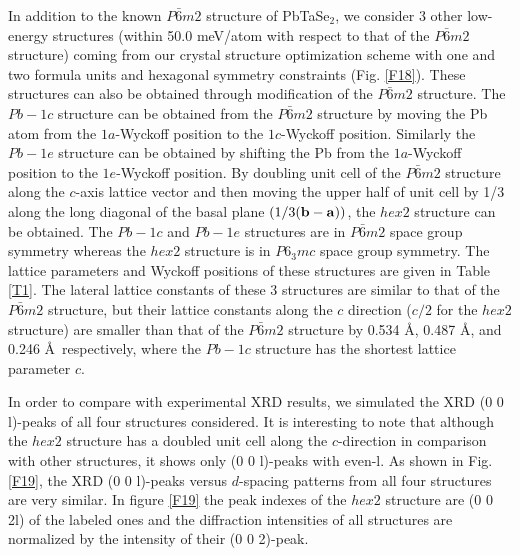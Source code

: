 \documentclass[aps,prb,preprint,groupedaddress,showpacs,amsmath,amssymb]{revtex4}
\begin{document}
In addition to the known $P\bar{6}m2$ structure of PbTaSe$_2$, we consider 3 other low-energy structures (within 50.0 meV/atom with respect to that of the $P\bar{6}m2$ structure) coming from our crystal structure optimization scheme with one and two formula units and hexagonal symmetry constraints (Fig. \ref{F18}). These structures can also be obtained through modification of the $P\bar{6}m2$ structure. The $Pb{-}1c$ structure can be obtained from the $P\bar{6}m2$ structure by moving the Pb atom from the $1a$-Wyckoff position to the $1c$-Wyckoff position. Similarly the $Pb{-}1e$ structure can be obtained by shifting the Pb from the $1a$-Wyckoff position  to the $1e$-Wyckoff position. By doubling unit cell of the $P\bar{6}m2$ structure along the $c$-axis lattice vector and then moving the upper half of unit cell by 1/3 along the long diagonal of the basal plane $(1/3(\bold{b} - \bold{a}))$, the $hex2$ structure can be obtained. The $Pb{-}1c$ and $Pb{-}1e$ structures are in $P\bar{6}m2$ space group symmetry whereas the $hex2$ structure is in $P6_3mc$ space group symmetry. The lattice parameters and Wyckoff positions of these structures are given in Table \ref{T1}. The lateral lattice constants of these 3 structures are similar to that of the $P\bar{6}m2$ structure, but their lattice constants along the $c$ direction ($c/2$ for the $hex2$ structure) are smaller than that of the $P\bar{6}m2$ structure by 0.534 \AA, 0.487 \AA, and 0.246 \AA~respectively, where the $Pb{-}1c$ structure has the shortest lattice parameter $c$. 

In order to compare with experimental XRD  results, we simulated the XRD (0 0 l)-peaks of all four structures considered. It is interesting to note that although the $hex2$ structure has a doubled unit cell along the $c$-direction in comparison with other structures, it shows only (0 0 l)-peaks with even-l. As shown in Fig. \ref{F19}, the XRD (0 0 l)-peaks versus $d$-spacing patterns from all four structures are very similar. In figure \ref{F19} the peak indexes of the $hex2$ structure are (0 0 2l) of the labeled ones and the diffraction intensities of all structures are normalized by the intensity of their (0 0 2)-peak. 
\end{document}
